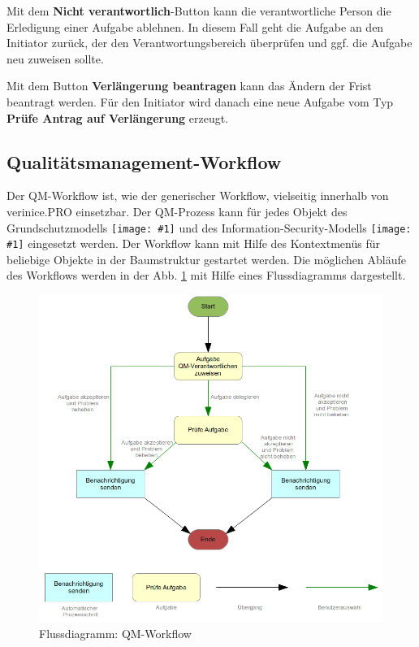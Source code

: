 \documentclass[a4paper,10pt]{book}
\newcommand{\icon}[1]{\texttt{[image: \#1]}}
\begin{document}
Mit dem \textbf{Nicht verantwortlich}-Button kann die verantwortliche Person die Erledigung einer Aufgabe ablehnen. In diesem Fall geht die Aufgabe an den Initiator zurück, der den Verantwortungsbereich überprüfen und ggf. die Aufgabe neu zuweisen sollte.

Mit dem Button \textbf{Verlängerung beantragen} kann das Ändern der Frist beantragt werden. Für den Initiator wird danach eine neue Aufgabe vom Typ \textbf{Prüfe Antrag auf Verlängerung} erzeugt.

\subsection{Qualitätsmanagement-Workflow}
Der QM-Workflow ist, wie der generischer Workflow, vielseitig innerhalb von verinice.\textsc{PRO} einsetzbar. Der QM-Prozess kann für jedes Objekt des
Grundschutzmodells \icon{Icon/GS_Modell.png} und des Information-Security-Modells \icon{Icon/Informationssicherheitsmodell.png}
eingesetzt werden. Der Workflow kann mit Hilfe des Kontextmenüs für beliebige Objekte in der Baumstruktur gestartet werden.
Die möglichen Abläufe des Workflows werden in der Abb. \ref{Flussdiagramm: QM-Workflow} mit Hilfe eines Flussdiagramms dargestellt.
\begin{figure}[htb!]
  \centering
  \includegraphics[scale=.40]{Screenshot/Qm-workflow.png}
  \caption{\label{Flussdiagramm: QM-Workflow} Flussdiagramm: QM-Workflow}
\end{figure}
\end{document}
